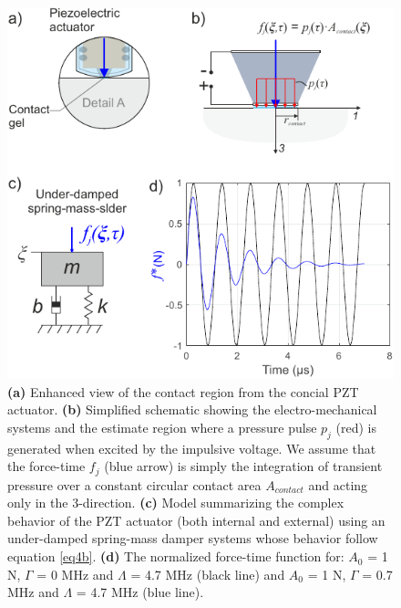 \documentclass[preprint,3p, 11pt,authoryear]{elsarticle}
\begin{document}
\begin{figure}[ht]
     	\centering
\includegraphics[scale= 0.9]{FIG2b.pdf} 
\caption{\textbf{(a)} Enhanced view of the contact region from the concial PZT actuator. \textbf{(b)} Simplified schematic showing the electro-mechanical systems and the estimate region where a pressure pulse $p_{j}$ (red) is generated when excited by the impulsive voltage. We assume that the force-time $f_{j}$ (blue arrow) is simply the integration of transient pressure over a constant circular contact area $A_{contact}$ and acting only in the 3-direction.  \textbf{(c)} Model summarizing the complex behavior of the PZT actuator (both internal and external) using an under-damped spring-mass damper systems whose behavior follow equation \eqref{eq4b}. \textbf{(d)} The normalized force-time function for: $A_{0}$ = 1 N, $\Gamma$ = 0 MHz and $\Lambda$ = 4.7 MHz (black line) and $A_{0}$ = 1 N, $\Gamma$ = 0.7 MHz and $\Lambda$ = 4.7 MHz (blue line).}
	\label{fig2b} 
\end{figure}
\end{document}
